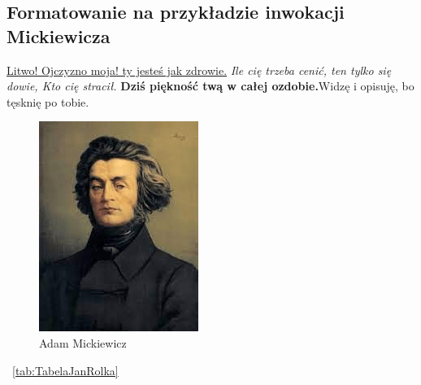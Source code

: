 \documentclass[a4paper]{article}
\begin{document}
\begin{center}

\subsection{Formatowanie na przykładzie inwokacji Mickiewicza}

\underline{Litwo! Ojczyzno moja! ty jesteś jak zdrowie.} \emph{Ile cię trzeba cenić, ten tylko się dowie, Kto cię stracił.} \textbf{Dziś piękność twą w całej ozdobie.}\Huge{Widzę i opisuję, bo tęsknię po tobie.}

\end{center}

\begin{figure}
    \centering
    \includegraphics[scale=0.5]{pictures/ObrazkiJR/Mickiewicz}
    \caption{Adam Mickiewicz}
    \label{fig:Mickiewicz}
\end{figure}

~\ref{tab:TabelaJanRolka} 

\end{document}
